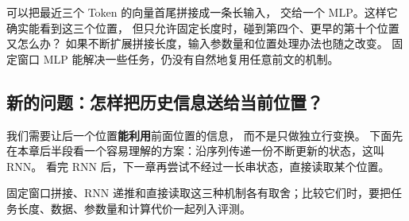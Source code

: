 可以把最近三个 Token 的向量首尾拼接成一条长输入，
交给一个 MLP。这样它确实能看到这三个位置，
但只允许固定长度时，碰到第四个、更早的第十个位置又怎么办？
如果不断扩展拼接长度，输入参数量和位置处理办法也随之改变。
固定窗口 MLP 能解决一些任务，仍没有自然地复用任意前文的机制。

\subsection{新的问题：怎样把历史信息送给当前位置？}

我们需要让后一个位置\textbf{能利用}前面位置的信息，
而不是只做独立行变换。
下面先在本章后半段看一个容易理解的方案：沿序列传递一份不断更新的状态，这叫 RNN。
看完 RNN 后，下一章再尝试不经过一长串状态，直接读取某个位置。

固定窗口拼接、RNN 递推和直接读取这三种机制各有取舍；比较它们时，要把任务长度、数据、参数量和计算代价一起列入评测。
